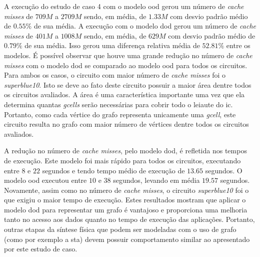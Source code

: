 

A execução do estudo de caso 4 com o modelo \ac{ood} gerou um número de  \textit{cache misses} de $709M$ a $2709M$ sendo, em média, de $1.33M$ com desvio padrão médio de $0.55\%$ de sua média. 
A execução com o modelo \ac{dod} gerou um número de  \textit{cache misses} de $401M$ a $1008M$ sendo, em média, de $629M$ com desvio padrão médio de $0.79\%$ de sua média.
Isso gerou uma diferença relativa média de $52.81\%$ entre os modelos.
É possível observar que houve uma grande redução no número de  \textit{cache misses} com o modelo \ac{dod} se comparado ao modelo \ac{ood} para todos os circuitos.
Para ambos os casos, o circuito com maior número de  \textit{cache misses} foi o \textit{superblue10}.
Isto se deve ao fato deste circuito possuir a maior área dentre todos os circuitos avaliados.
A área é uma característica importante uma vez que ela determina quantas \textit{gcells} serão necessárias para cobrir todo o leiaute do \ac{ic}.
Portanto, como cada vértice do grafo representa unicamente uma \textit{gcell}, este circuito resulta no grafo com maior número de vértices dentre todos os circuitos avaliados.

A redução no número de  \textit{cache misses}, pelo modelo \ac{dod}, é refletida nos tempos de execução.
Este modelo foi mais rápido para todos os circuitos, executando entre $8$ e $22$ segundos e tendo tempo médio de execução de $13.65$ segundos.
O modelo \ac{ood} executou entre $10$ e $38$ segundos, levando em média $19.57$ segundos.
Novamente, assim como no número de  \textit{cache misses}, o circuito \textit{superblue10} foi o que exigiu o maior tempo de execução.
Estes resultados mostram que aplicar o modelo \ac{dod} para representar um grafo é vantajoso e proporciona uma melhoria tanto no acesso aos dados quanto no tempo de execução das aplicações.
Portanto, outras etapas da síntese física que podem ser modeladas com o uso de grafo (como por exemplo a \ac{sta}) devem possuir comportamento similar ao apresentado por este estudo de caso.


